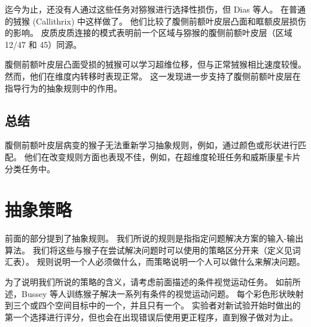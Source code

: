 迄今为止，还没有人通过这些任务对猕猴进行选择性损伤，但 Dias 等人。
\cite{dias1997dissociable}在普通的狨猴 (Callithrix) 中这样做了。 
他们比较了腹侧前额叶皮层凸面和眶额皮层损伤的影响。 
皮质皮质连接的模式表明前一个区域与猕猴的腹侧前额叶皮层（区域 12/47 和 45）同源\cite{roberts2007forebrain}。
\par


腹侧前额叶皮层凸面受损的狨猴可以学习超维位移，但与正常狨猴相比速度较慢\cite{dias1997dissociable}。
然而，他们在维度内转移时表现正常。 
这一发现进一步支持了腹侧前额叶皮层在指导行为的抽象规则中的作用。



\subsection{总结}
\par

腹侧前额叶皮层病变的猴子无法重新学习抽象规则，例如，通过颜色或形状进行匹配。
他们在改变规则方面也表现不佳，例如，在超维度轮班任务和威斯康星卡片分类任务中。



\section{抽象策略}
\par 
前面的部分提到了抽象规则。
我们所说的规则是指指定问题解决方案的输入-输出算法。
我们将这些与猴子在尝试解决问题时可以使用的策略区分开来（定义见词汇表）。
规则说明一个人必须做什么，而策略说明一个人可以做什么来解决问题。
\par 


为了说明我们所说的策略的含义，请考虑前面描述的条件视觉运动任务。 
如前所述，Bussey 等人\cite{bussey2001role}训练猴子解决一系列有条件的视觉运动问题。
每个彩色形状映射到三个或四个空间目标中的一个，并且只有一个。
实验者对新试验开始时做出的第一个选择进行评分，但也会在出现错误后使用更正程序，直到猴子做对为止。


